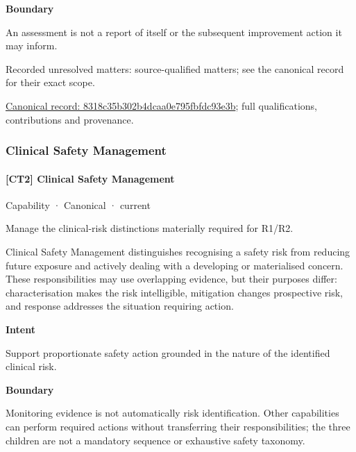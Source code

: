 \textbf{Boundary}



An assessment is not a report of itself or the subsequent improvement action it may inform.


{\small Recorded unresolved matters: source-qualified matters; see the canonical record for their exact scope.}\par
{\footnotesize \href{../../../../continuum/strategy/capability/8318c35b302b4dcaa0e795fbfdc93e3b.md}{Canonical record: 8318c35b302b4dcaa0e795fbfdc93e3b}; full qualifications, contributions and provenance.}\par
\subsubsection{Clinical Safety Management}

\paragraph{[CT2] Clinical Safety Management}

\label{element:28d1bf3e514e4c29837ebedaf9e4917b}
{\small Capability · Canonical · current}\par

Manage the clinical-risk distinctions materially required for R1/R2.



Clinical Safety Management distinguishes recognising a safety risk from reducing future exposure and actively dealing with a developing or materialised concern. These responsibilities may use overlapping evidence, but their purposes differ: characterisation makes the risk intelligible, mitigation changes prospective risk, and response addresses the situation requiring action.



\textbf{Intent}



Support proportionate safety action grounded in the nature of the identified clinical risk.



\textbf{Boundary}



Monitoring evidence is not automatically risk identification. Other capabilities can perform required actions without transferring their responsibilities; the three children are not a mandatory sequence or exhaustive safety taxonomy.


